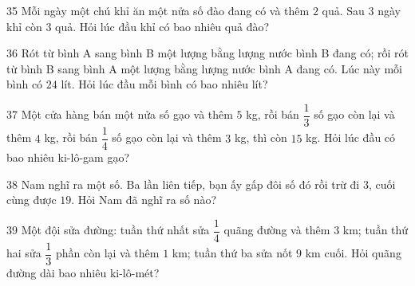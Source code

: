 \gap
\begin{probbox}{35}{}
Mỗi ngày một chú khỉ ăn một nửa số đào đang có và thêm $2$ quả. Sau $3$ ngày khỉ còn $3$ quả. Hỏi lúc đầu khỉ có bao nhiêu quả đào?
\end{probbox}
\gap
\begin{probbox}{36}{}
Rót từ bình A sang bình B một lượng bằng lượng nước bình B đang có; rồi rót từ bình B sang bình A một lượng bằng lượng nước bình A đang có. Lúc này mỗi bình có $24$ lít. Hỏi lúc đầu mỗi bình có bao nhiêu lít?
\end{probbox}
\gap
\begin{probbox}{37}{}
Một cửa hàng bán một nửa số gạo và thêm $5$ kg, rồi bán $\dfrac13$ số gạo còn lại và thêm $4$ kg, rồi bán $\dfrac14$ số gạo còn lại và thêm $3$ kg, thì còn $15$ kg. Hỏi lúc đầu có bao nhiêu ki-lô-gam gạo?
\end{probbox}
\gap
\begin{probbox}{38}{}
Nam nghĩ ra một số. Ba lần liên tiếp, bạn ấy gấp đôi số đó rồi trừ đi $3$, cuối cùng được $19$. Hỏi Nam đã nghĩ ra số nào?
\end{probbox}
\gap
\begin{probbox}{39}{}
Một đội sửa đường: tuần thứ nhất sửa $\dfrac14$ quãng đường và thêm $3$ km; tuần thứ hai sửa $\dfrac13$ phần còn lại và thêm $1$ km; tuần thứ ba sửa nốt $9$ km cuối. Hỏi quãng đường dài bao nhiêu ki-lô-mét?
\end{probbox}
